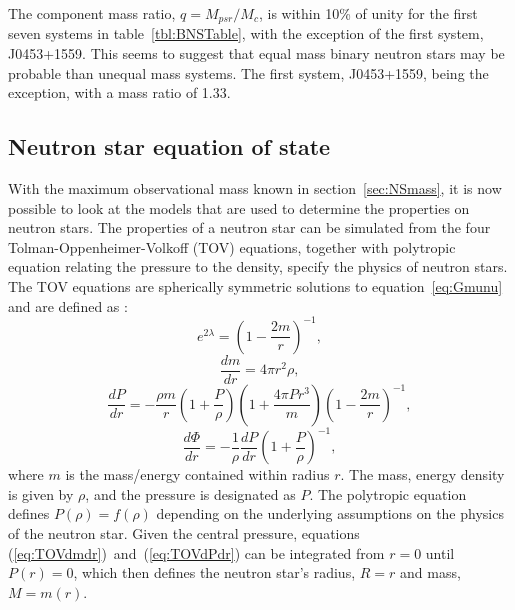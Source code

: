 \begin{table}[H]
	\begin{center}
		\caption[\protect]{\protect}
		\label{tbl:BNSTable}
	\end{center}
\end{table}	
The component mass ratio, $q=M_{psr}/M_c$, is within 10\% of unity for the first seven systems in table~\ref{tbl:BNSTable}, with the exception of the first system, J0453+1559. This seems to suggest that equal mass binary neutron stars may be probable than unequal mass systems. The first system, J0453+1559, being the exception, with a mass ratio of 1.33. 
\subsection{Neutron star equation of state}
\label{sec:EOS}
With the maximum observational mass known in section~\ref{sec:NSmass}, it is now possible to look at the models that are used to determine the properties on neutron stars. 
The properties of a neutron star can be simulated from the four Tolman-Oppenheimer-Volkoff (TOV) equations, together with polytropic equation relating the pressure to the density, specify the physics of neutron stars. The TOV equations are spherically symmetric solutions to equation~\ref{eq:Gmunu} and are defined as \citep[eg][Ch 5.7]{Shapiro2004}:
\begin{equation}
e^{2\lambda} = \left(1-\dfrac{2m}{r}\right)^{-1},
\label{eq:TOVmetric}
\end{equation}
\begin{equation}
\dfrac{dm}{dr}=4\pi r^2 \rho,
\label{eq:TOVdmdr}
\end{equation}
\begin{equation}
\dfrac{dP}{dr}=-\dfrac{\rho m}{r}\left(1+\dfrac{P}{\rho}\right)\left(1+\dfrac{4\pi P r^3}{m}\right)\left(1-\dfrac{2m}{r}\right)^{-1},
\label{eq:TOVdPdr}
\end{equation}
\begin{equation}
\dfrac{d\Phi}{dr}=-\dfrac{1}{\rho}	\dfrac{dP}{dr} \left(1+\dfrac{P}{\rho}\right)^{-1},
\label{eq:TOVpotential}
\end{equation}
where $m$ is the mass/energy contained within radius $r$. The mass, energy density is given by $\rho$, and the pressure is designated as $P$. The polytropic equation defines $P(\rho) = f(\rho)$ depending on the underlying assumptions on the physics of the neutron star. Given the central pressure, equations (\ref{eq:TOVdmdr})~and~(\ref{eq:TOVdPdr}) can be integrated from $r=0$ until $P(r)=0$, which then defines the neutron star's radius, $R=r$  and mass, $M=m(r)$.\par
